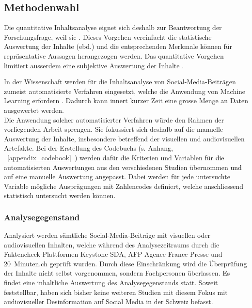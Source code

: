 \documentclass[12pt,a4paper]{article}        %
\begin{document}
\subsection{Methodenwahl}
Die quantitative Inhaltsanalyse eignet sich deshalb zur Beantwortung der Forschungsfrage, weil sie  \parencites[11]{oehmer-pedrazzi_standardisierte_2023}[vgl.\ auch][227]{lobinger_quantitative_2012}. Dieses Vorgehen vereinfacht die statistische Auswertung der Inhalte (ebd.) und die entsprechenden Merkmale können für repräsentative Aussagen herangezogen werden. Das quantitative Vorgehen limitiert ausserdem eine subjektive Auswertung der Inhalte \parencite[140]{lai_content_2015}.

In der Wissenschaft werden für die Inhaltsanalyse von Social-Media-Beiträgen zumeist automatisierte Verfahren eingesetzt, welche die Anwendung von Machine Learning erfordern \parencites[vgl.\ bspw.]{andreotta_analyzing_2019}{lai_content_2015}
{schwartz_data-driven_2015}{wilson_content_2022}{wang_video_2015}. Dadurch kann innert kurzer Zeit eine grosse Menge an Daten ausgewertet werden.\\
Die Anwendung solcher automatisierter Verfahren würde den Rahmen der vorliegenden Arbeit sprengen. Sie fokussiert sich deshalb auf die manuelle Auswertung der Inhalte, insbesondere betreffend der visuellen und audiovisuellen Artefakte. Bei der Erstellung des Codebuchs (s. Anhang, ~\ref{appendix_codebook}~) werden dafür die Kriterien und Variablen für die automatisierten Auswertungen aus den verschiedenen Studien übernommen und auf eine manuelle Auswertung angepasst. Dabei werden für jede untersuchte Variable mögliche Ausprägungen mit Zahlencodes definiert, welche anschliessend statistisch untersucht werden können.
\subsubsection{Analysegegenstand}
Analysiert werden sämtliche Social-Media-Beiträge mit visuellen oder audiovisuellen Inhalten, welche während des Analysezeitraums durch die Faktencheck-Plattformen Keystone-SDA, AFP Agence France-Presse und 20 Minuten.ch geprüft wurden. Durch diese Einschränkung wird die Überprüfung der Inhalte nicht selbst vorgenommen, sondern Fachpersonen überlassen. Es findet eine inhaltliche Auswertung des Analysegegenstands statt. Soweit feststellbar, haben sich bisher keine weiteren Studien mit diesem Fokus mit audiovisueller Desinformation auf Social Media in der Schweiz befasst.
\end{document}
